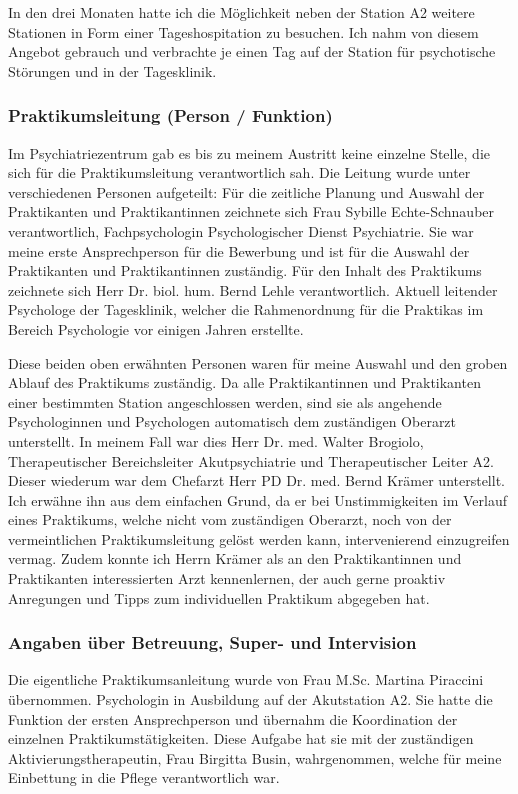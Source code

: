 In den drei Monaten hatte ich die Möglichkeit neben der Station A2 weitere Stationen in Form einer Tageshospitation zu besuchen. Ich nahm von diesem Angebot gebrauch und verbrachte je einen Tag auf der Station für psychotische Störungen und in der Tagesklinik. 

\subsubsection{Praktikumsleitung (Person / Funktion)}
Im Psychiatriezentrum gab es bis zu meinem Austritt keine einzelne Stelle, die sich für die Praktikumsleitung verantwortlich sah. Die Leitung wurde unter verschiedenen Personen aufgeteilt: Für die zeitliche Planung und Auswahl der Praktikanten und Praktikantinnen zeichnete sich Frau Sybille Echte-Schnauber verantwortlich, Fachpsychologin Psychologischer Dienst Psychiatrie. Sie war meine erste Ansprechperson für die Bewerbung und ist für die Auswahl der Praktikanten und Praktikantinnen zuständig. Für den Inhalt des Praktikums zeichnete sich Herr Dr. biol. hum. Bernd Lehle verantwortlich. Aktuell leitender Psychologe der Tagesklinik, welcher die Rahmenordnung für die Praktikas im Bereich Psychologie vor einigen Jahren erstellte. 

Diese beiden oben erwähnten Personen waren für meine Auswahl und den groben Ablauf des Praktikums zuständig. Da alle Praktikantinnen und Praktikanten einer bestimmten Station angeschlossen werden, sind sie als angehende Psychologinnen und Psychologen automatisch dem zuständigen Oberarzt unterstellt. In meinem Fall war dies Herr Dr. med. Walter Brogiolo, Therapeutischer Bereichsleiter Akutpsychiatrie und Therapeutischer Leiter A2. Dieser wiederum war dem Chefarzt Herr PD Dr. med. Bernd Krämer unterstellt. Ich erwähne ihn aus dem einfachen Grund, da er bei Unstimmigkeiten im Verlauf eines Praktikums, welche nicht vom zuständigen Oberarzt, noch von der vermeintlichen Praktikumsleitung gelöst werden kann, intervenierend einzugreifen vermag. Zudem konnte ich Herrn Krämer als an den Praktikantinnen und Praktikanten interessierten Arzt kennenlernen, der auch gerne proaktiv Anregungen und Tipps zum individuellen Praktikum abgegeben hat.

\subsubsection{Angaben über Betreuung, Super- und Intervision}
Die eigentliche Praktikumsanleitung wurde von Frau M.Sc. Martina Piraccini übernommen. Psychologin in Ausbildung auf der Akutstation A2. Sie hatte die Funktion der ersten Ansprechperson und übernahm die Koordination der einzelnen Praktikumstätigkeiten. Diese Aufgabe hat sie mit der zuständigen Aktivierungstherapeutin, Frau Birgitta Busin, wahrgenommen, welche für meine Einbettung in die Pflege verantwortlich war. 

